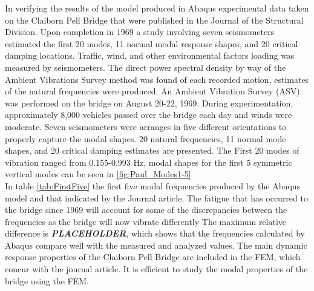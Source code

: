 %


In verifying the results of the model produced in Abaqus experimental data taken on the Claiborn Pell Bridge that were published in the Journal of the
Structural Division.
Upon completion in 1969 a study involving seven seismometers estimated the first 20 modes, 11 normal modal response shapes, and 20
critical damping locations.
Traffic, wind, and other environmental factors loading was measured by seismometers. The direct power spectral density by
way of the Ambient Vibrations Survey method was found of each recorded motion, estimates of the natural frequencies were produced.
An Ambient Vibration Survey (ASV) was performed on the bridge on August 20-22, 1969.
During experimentation, approximately 8,000 vehicles passed over the bridge each day
and winds were moderate. Seven seismometers were arranges in five different orientations to properly capture the modal shapes.
20 natural frequencies, 11 normal mode shapes, and 20 critical damping estimates are presented.
The First 20 modes of vibration ranged from 0.155-0.993 Hz,
modal shapes for the first 5 symmetric vertical modes can be seen in \ref{fig:Paul_Modes1-5}\\


In table \ref{tab:FirstFive} the first five modal frequencies produced by the Abaqus model and that indicated by the Journal article. 
The fatigue that has occurred to the bridge since 1969 will account for some of the discrepancies between the frequencies as the bridge will now vibrate differently 
The maximum relative difference is \textbf{\textit{PLACEHOLDER}}, which shows that the frequencies calculated by Abaqus compare well with the measured and analyzed values. 
The main dynamic response properties of the Claiborn Pell Bridge are included in the FEM, which concur with the journal article. 
It is efficient to study the modal properties of the bridge using the FEM.


